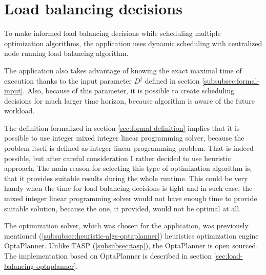 \section{Load balancing decisions}\label{sec:load-balancing-decisions}

To make informed load balancing decisions while scheduling multiple optimization algorithms,
the application uses dynamic scheduling with centralized node running load balancing algorithm.

The application also takes advantage of knowing the exact maximal time of execution thanks to the input parameter $D^{j}$ 
defined in section \ref{subsubsec:formal-input}.
Also,
because of this parameter, 
it is possible to create scheduling decisions for much larger time horizon, 
because algorithm is aware of the future workload.

The definition formalized in section \ref{sec:formal-definition} implies 
that it is possible to use integer mixed integer linear programming solver, 
because the problem itself is defined as integer linear programming problem.
That is indeed possible, 
but after careful consideration I rather decided to use heuristic approach.
The main reason for selecting this type of optimization algorithm is,
that it provides suitable results during the whole runtime.
This could be very handy when the time for load balancing decisions is tight
and in such case, the mixed integer linear programming solver would not have enough time to provide suitable solution,
because the one, it provided, would not be optimal at all.

The optimization solver, which was chosen for the application,
was previously mentioned (\ref{subsubsec:heuristic-algs-optaplanner}) heuristics optimization engine OptaPlanner.
Unlike TASP (\ref{subsubsec:tasp}), the OptaPlanner is open sourced.
The implementation based on OptaPlanner is described in section \ref{sec:load-balancing-optaplanner}.